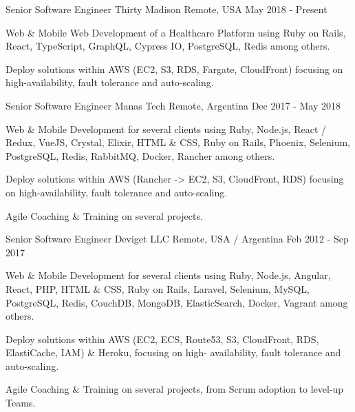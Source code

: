 
\begin{cventries}

  \cventry
    {Senior Software Engineer}
    {Thirty Madison}
    {Remote, USA}
    {May 2018 - Present}
    {
      \begin{cvitems}
        \item {Web \& Mobile Web Development of a Healthcare Platform using Ruby on Rails, React, TypeScript, GraphQL, Cypress IO, PostgreSQL, Redis among others.}
        \item {Deploy solutions within AWS (EC2, S3, RDS, Fargate, CloudFront) focusing on high-availability, fault tolerance and auto-scaling.}
      \end{cvitems}
    }

  \cventry
    {Senior Software Engineer}
    {Manas Tech}
    {Remote, Argentina}
    {Dec 2017 - May 2018 }
    {
      \begin{cvitems}
        \item {Web \& Mobile Development for several clients using Ruby, Node.js, React / Redux, VueJS, Crystal, Elixir, HTML \& CSS, Ruby on Rails, Phoenix, Selenium, PostgreSQL, Redis, RabbitMQ, Docker, Rancher among others.}
        \item {Deploy solutions within AWS (Rancher -> EC2, S3, CloudFront, RDS) focusing on high-availability, fault tolerance and auto-scaling.}
        \item {Agile Coaching \& Training on several projects.}
      \end{cvitems}
    }

  \cventry
    {Senior Software Engineer}
    {Deviget LLC}
    {Remote, USA / Argentina}
    {Feb 2012 - Sep 2017}
    {
      \begin{cvitems}
        \item {Web \& Mobile Development for several clients using Ruby, Node.js, Angular, React, PHP, HTML \& CSS, Ruby on Rails, Laravel, Selenium, MySQL, PostgreSQL, Redis, CouchDB, MongoDB, ElasticSearch, Docker, Vagrant among others.}
        \item {Deploy solutions within AWS (EC2, ECS, Route53, S3, CloudFront, RDS, ElastiCache, IAM) \& Heroku, focusing on high- availability, fault tolerance and auto-scaling.}
        \item {Agile Coaching \& Training on several projects, from Scrum adoption to level-up Teams.}
      \end{cvitems}
    }


\end{cventries}
